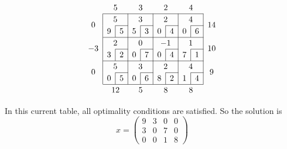 \[
	\arraycolsep=5pt\def\arraystretch{1.2}
	\begin{array}{c|c|c|c|c|c|c|c|c|c}
		\multicolumn{1}{c}{}           & \multicolumn{2}{c}{5}              & \multicolumn{2}{c}{3}              & \multicolumn{2}{c}{2}              & \multicolumn{2}{c}{4}              & \multicolumn{1}{c}{}                                                          \\\cline{2-9}
		\multirow{2}{*}{\(0\)} & \multicolumn{2}{c|}{5} & \multicolumn{2}{c|}{3} & \multicolumn{2}{c|}{2} & \multicolumn{2}{c|}{4} & \multirow{2}{*}{\(14\)}                                                      \\\cline{3-3}\cline{5-5}\cline{7-7}\cline{9-9}
		                               & \multicolumn{1}{c|}{9}            & 5                                 & \multicolumn{1}{c|}{5}            & 3                                 & \multicolumn{1}{c|}{0} & 4 & \multicolumn{1}{c|}{0} & 6 & \\\cline{2-9}
		\multirow{2}{*}{\(-3\)} & \multicolumn{2}{c|}{2} & \multicolumn{2}{c|}{0} & \multicolumn{2}{c|}{-1} & \multicolumn{2}{c|}{1} & \multirow{2}{*}{\(10\)}                                                      \\\cline{3-3}\cline{5-5}\cline{7-7}\cline{9-9}
		                               & \multicolumn{1}{c|}{3}            & 2                                 & \multicolumn{1}{c|}{0}            & 7                                 & \multicolumn{1}{c|}{0} & 4 & \multicolumn{1}{c|}{7} & 1 & \\\cline{2-9}
		\multirow{2}{*}{\(0\)} & \multicolumn{2}{c|}{5} & \multicolumn{2}{c|}{3} & \multicolumn{2}{c|}{2} & \multicolumn{2}{c|}{4} & \multirow{2}{*}{\(9\)}                                                      \\\cline{3-3}\cline{5-5}\cline{7-7}\cline{9-9}
		                               & \multicolumn{1}{c|}{0}            & 5                                 & \multicolumn{1}{c|}{0}            & 6                                 & \multicolumn{1}{c|}{8} & 2 & \multicolumn{1}{c|}{1} & 4 & \\\cline{2-9}
		\multicolumn{1}{c}{}           & \multicolumn{2}{c}{12}                & \multicolumn{2}{c}{5}                & \multicolumn{2}{c}{8}                & \multicolumn{2}{c}{8}                & \multicolumn{1}{c}{}
	\end{array}
\]

\noindent In this current table, all optimality conditions are satisfied.
So the solution is
\[ x = \begin{pmatrix}
    9 & 3 & 0 & 0 \\
    3 & 0 & 7 & 0 \\
    0 & 0 & 1 & 8
\end{pmatrix} \]
